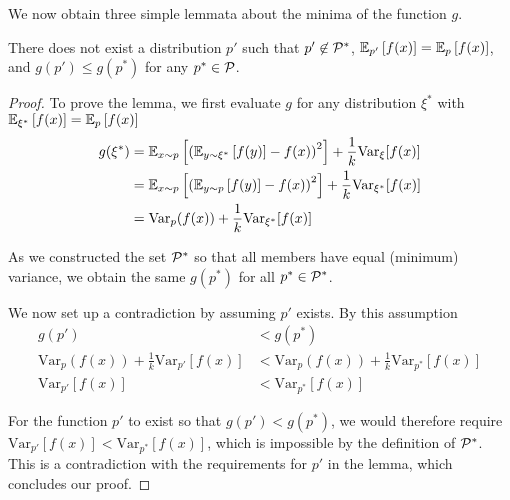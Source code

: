 We now obtain three simple lemmata about the minima of the function $g$.

\begin{lemma}\label{lemma3}
There does not exist a distribution $p'$ such that $p'\not\in \P^*$, $\EEX{p'}{f(x)} = \EEX{p}{f(x)}$, and $g(p') \leq g(p^*)$ for any $p^*\in\P$.
\end{lemma}

\begin{proof}
    To prove the lemma, we first evaluate $g$ for any distribution $\xi^*$ with $\EEX{\xi^*}{f(x)} = \EEX{p}{f(x)}$ 
    \begin{align}
        g(\xi^*) &= \EEX{x \sim p}{\left(\EEX{y \sim \xi^*}{f(y)} - f(x)\right)^2} + \frac{1}{k}\mathrm{Var}_\xi[f(x)]\\
        &= \EEX{x \sim p}{\left(\EEX{y \sim p}{f(y)} - f(x)\right)^2} + \frac{1}{k}\mathrm{Var}_{\xi^*}[f(x)]\\
        &= \mathrm{Var}_{p}(f(x)) + \frac{1}{k}\mathrm{Var}_{\xi^*}[f(x)]
    \end{align}
    
    As we constructed the set $\P^*$ so that all members have equal (minimum) variance, we obtain the same $g(p^*)$ for all $p^*\in\P^*$.

    We now set up a contradiction by assuming $p'$ exists. By this assumption
    \begin{align}
        g(p') &< g(p^*) \\
        \mathrm{Var}_{p}(f(x)) + \frac{1}{k}\mathrm{Var}_{p'}[f(x)] &< \mathrm{Var}_{p}(f(x)) + \frac{1}{k}\mathrm{Var}_{p^*}[f(x)]\\
        \mathrm{Var}_{p'}[f(x)] &< \mathrm{Var}_{p^*}[f(x)]
    \end{align}

    For the function $p'$ to exist so that $g(p') < g(p^*)$, we would therefore require $\mathrm{Var}_{p'}[f(x)] < \mathrm{Var}_{p^*}[f(x)]$, which is impossible by the definition of $\P^*$.
    This is a contradiction with the requirements for $p'$ in the lemma, which concludes our proof.
\end{proof}

